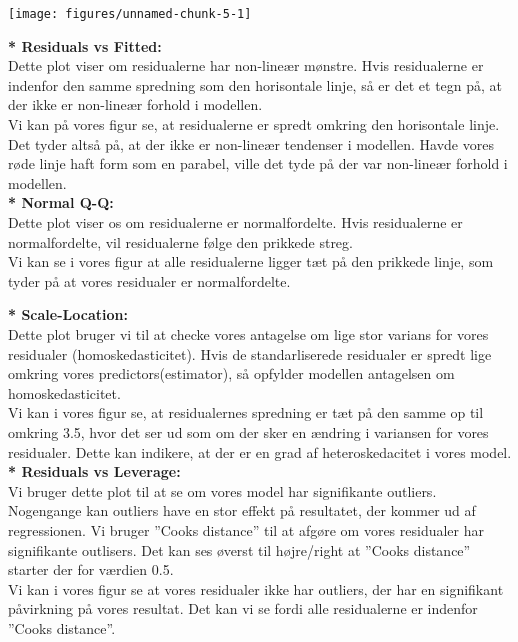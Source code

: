 \documentclass[
  10pt,
]{article}
\begin{document}
\begin{center}\texttt{[image: figures/unnamed-chunk-5-1]} \end{center}

\textbf{* Residuals vs Fitted:}\\
Dette plot viser om residualerne har non-lineær mønstre. Hvis
residualerne er indenfor den samme spredning som den horisontale linje,
så er det et tegn på, at der ikke er non-lineær forhold i modellen.\\
Vi kan på vores figur se, at residualerne er spredt omkring den
horisontale linje. Det tyder altså på, at der ikke er non-lineær
tendenser i modellen. Havde vores røde linje haft form som en parabel,
ville det tyde på der var non-lineær forhold i modellen.\\

\textbf{* Normal Q-Q:}\\
Dette plot viser os om residualerne er normalfordelte. Hvis residualerne
er normalfordelte, vil residualerne følge den prikkede streg.\\
Vi kan se i vores figur at alle residualerne ligger tæt på den prikkede
linje, som tyder på at vores residualer er normalfordelte.\\
\newpage

\textbf{* Scale-Location:}\\
Dette plot bruger vi til at checke vores antagelse om lige stor varians
for vores residualer (homoskedasticitet). Hvis de standarliserede
residualer er spredt lige omkring vores predictors(estimator), så
opfylder modellen antagelsen om homoskedasticitet.\\
Vi kan i vores figur se, at residualernes spredning er tæt på den samme
op til omkring 3.5, hvor det ser ud som om der sker en ændring i
variansen for vores residualer. Dette kan indikere, at der er en grad af
heteroskedacitet i vores model.\\

\textbf{* Residuals vs Leverage:}\\
Vi bruger dette plot til at se om vores model har signifikante outliers.
Nogengange kan outliers have en stor effekt på resultatet, der kommer ud
af regressionen. Vi bruger ''Cooks distance'' til at afgøre om vores
residualer har signifikante outlisers. Det kan ses øverst til
højre/right at ''Cooks distance'' starter der for værdien 0.5.\\
Vi kan i vores figur se at vores residualer ikke har outliers, der har
en signifikant påvirkning på vores resultat. Det kan vi se fordi alle
residualerne er indenfor ''Cooks distance''. \newpage
\end{document}
